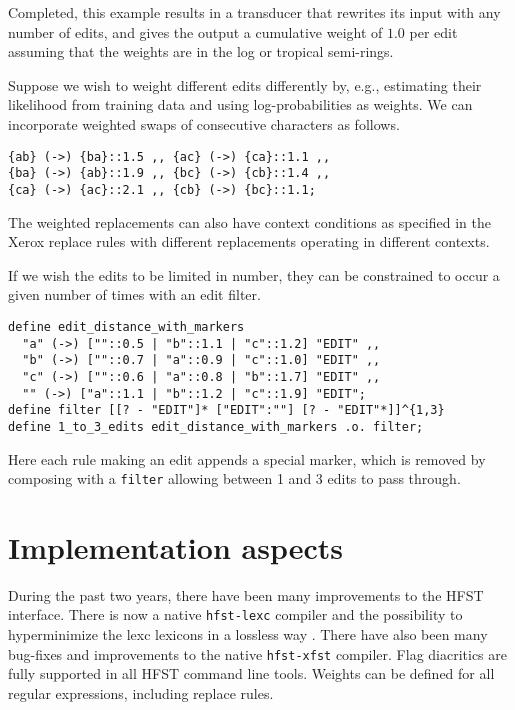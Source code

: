 \documentclass{llncs}
\begin{document}
\noindent Completed, this example results in a transducer that rewrites
its input with any number of edits, and gives the output a cumulative weight of
$1.0$ per edit assuming that the weights are in the log or tropical
semi-rings.

Suppose we wish to weight different edits differently by, e.g., 
estimating their likelihood from training data and using log-probabilities as weights. 
We can incorporate weighted swaps of consecutive characters as follows.

\begin{center}
\begin{framed}
\begin{verbatim}
{ab} (->) {ba}::1.5 ,, {ac} (->) {ca}::1.1 ,,
{ba} (->) {ab}::1.9 ,, {bc} (->) {cb}::1.4 ,,
{ca} (->) {ac}::2.1 ,, {cb} (->) {bc}::1.1;
\end{verbatim}
\end{framed}
\end{center}

\noindent The weighted replacements can also have context conditions as specified 
in the Xerox replace rules \cite{drobac/2012} 
with different replacements operating in different contexts.

If we wish the edits to be limited in number, they can be constrained to occur a given number of times with an edit
filter.

\begin{center}
\begin{framed}
\begin{verbatim}
define edit_distance_with_markers
  "a" (->) [""::0.5 | "b"::1.1 | "c"::1.2] "EDIT" ,,
  "b" (->) [""::0.7 | "a"::0.9 | "c"::1.0] "EDIT" ,,
  "c" (->) [""::0.6 | "a"::0.8 | "b"::1.7] "EDIT" ,,
  "" (->) ["a"::1.1 | "b"::1.2 | "c"::1.9] "EDIT";
define filter [[? - "EDIT"]* ["EDIT":""] [? - "EDIT"*]]^{1,3}
define 1_to_3_edits edit_distance_with_markers .o. filter;
\end{verbatim}
\end{framed}
\end{center}

\noindent Here each rule making an edit appends a special marker, which is removed
by composing with a \verb+filter+ allowing between 1 and 3
edits to pass through.

\section{Implementation aspects}\label{sec:background}
During the past two years, there have been many improvements to the HFST 
interface. There is now a native {\tt hfst-lexc} compiler and the possibility to 
hyperminimize the lexc lexicons in a lossless way \cite{drobac/2014}. There have also been many bug-fixes and 
improvements to the native {\tt hfst-xfst} compiler. Flag diacritics are fully supported 
in all HFST command line tools. Weights can be defined for all regular expressions,
including replace rules.
\end{document}
